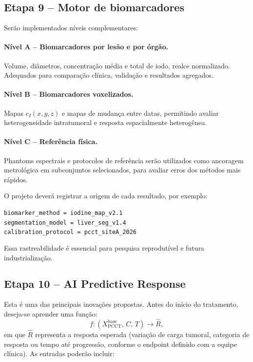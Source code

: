 \documentclass[11pt,a4paper]{article}
\begin{document}
\subsection{Etapa 9 -- Motor de biomarcadores}

Serão implementados níveis complementares:

\paragraph{Nível A -- Biomarcadores por lesão e por órgão.} Volume, diâmetros, concentração média e total de iodo, realce normalizado. Adequados para comparação clínica, validação e resultados agregados.

\paragraph{Nível B -- Biomarcadores voxelizados.} Mapas $c_{I}(x,y,z)$ e mapas de mudança entre datas, permitindo avaliar heterogeneidade intratumoral e resposta espacialmente heterogênea.

\paragraph{Nível C -- Referência física.} Phantoms espectrais e protocolos de referência serão utilizados como ancoragem metrológica em subconjuntos selecionados, para avaliar erros dos métodos mais rápidos.

O projeto deverá registrar a origem de cada resultado, por exemplo:
\begin{center}
\texttt{biomarker\_method = iodine\_map\_v2.1}\\
\texttt{segmentation\_model = liver\_seg\_v1.4}\\
\texttt{calibration\_protocol = pcct\_siteA\_2026}
\end{center}
Essa rastreabilidade é essencial para pesquisa reprodutível e futura industrialização.

\subsection{Etapa 10 -- AI Predictive Response}

Esta é uma das principais inovações propostas. Antes do início do tratamento, deseja-se aprender uma função:
\begin{equation}
f : \left( X_{\text{PCCT}}^{\text{base}},\, C,\, T \right) \rightarrow \widehat{R},
\end{equation}
em que $\widehat{R}$ representa a resposta esperada (variação de carga tumoral, categoria de resposta ou tempo até progressão, conforme o endpoint definido com a equipe clínica). As entradas poderão incluir:
\end{document}
